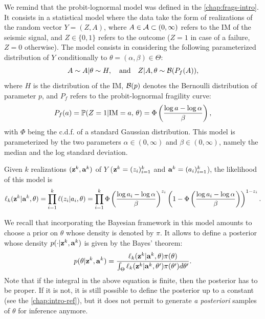 We remind that the probit-lognormal model was defined in the \cref{chap:frags-intro}. It consists in a statistical model where the data take the form of realizations of the random vector $Y=(Z,A)$, where $A\in\mathcal{A}\subset(0,\infty)$ refers to the IM of the seismic signal, and $Z\in\{0,1\}$ refers to the outcome ($Z=1$ in case of a failure, $Z=0$ otherwise). The model consists in considering
the following parameterized distribution of $Y$ conditionally to $\theta=(\alpha,\beta)\in\Theta$:
    \begin{equation}
        A\sim A|\theta\sim H,\quad\text{and}\quad Z|A,\theta\sim\mathcal{B}(P_f(A)),
    \end{equation}
where $H$ is the distribution of the IM, $\mathcal{B}(p)$ denotes the Bernoulli distribution of parameter $p$, and $P_f$ refers to the probit-lognormal fragility curve:
\begin{equation}
    P_f(a) = \mathbb{P}(Z=1|\text{IM}=a,\,\theta) = \Phi\left(\frac{\log a-\log\alpha}{\beta}\right),
\end{equation}
with $\Phi$ being the c.d.f. of a standard Gaussian distribution. This model is parameterized by the two parameters $\alpha\in(0,\infty)$ and $\beta\in(0,\infty)$, namely the median and the log standard deviation. 

Given $k$ realizations $(\mathbf{z}^k,\mathbf{a}^k)$ of $Y$ ($\mathbf{z}^k=(z_i)_{i=1}^k$ and $\mathbf{a}^k=(a_i)_{i=1}^k$), the likelihood of this model is
\begin{equation}\label{eq:constr-frag:likelihood}
    \ell_k(\mathbf{z}^k|\mathbf{a}^k,\theta) = \prod_{i=1}^k\ell(z_i|a_i,\theta) = \prod_{i=1}^k\Phi\left(\frac{\log a_i-\log\alpha}{\beta}\right)^{z_i}\left(1-\Phi\left(\frac{\log a_i-\log\alpha}{\beta}\right)\right)^{1-z_i}.
\end{equation}






We recall that incorporating the Bayesian framework in this model amounts to choose a prior on $\theta$ whose density is denoted by $\pi$.
It allows to define a posterior whose density $p(\cdot|\mathbf{z}^k,\mathbf{a}^k)$ is given by the Bayes' theorem:
\begin{equation}\label{eq:constr-frag:posterior}
    p(\theta|\mathbf{z}^k,\mathbf{a}^k) = \frac{\ell_k(\mathbf{z}^k|\mathbf{a}^k,\theta)\pi(\theta)}{\int_{\Theta}\ell_k(\mathbf{z}^k|\mathbf{a}^k,\theta')\pi(\theta')d\theta'}.
\end{equation}
Note that if the integral in the above equation is finite, then the posterior has to be proper. If it is not, it is still possible to define the posterior up to a constant (see the \cref{chap:intro-ref}), but it does not permit to generate \emph{a posteriori} samples of $\theta$ for inference anymore.




